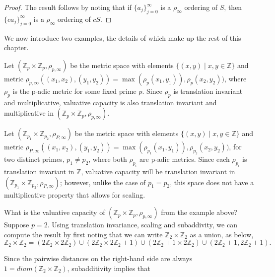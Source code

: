\begin{proof} 
The result follows by noting that if $\{a_j\}_{j=0}^\infty$ is a $\rho_\infty$ ordering of $S$, then $\{ca_j\}_{j=0}^\infty$ is a $\rho_\infty$ ordering of $cS$.
\end{proof}

We now introduce two examples, the details of which make up the rest of this chapter.\\ 

\begin{example}
	Let $(\mathbb{Z}_p \times \mathbb{Z}_p, \rho_{p,\infty})$ be the metric space with elements $\{(x,y)\mid x,y \in \mathbb{Z}\}$ and metric $\rho_{p,\infty}((x_1,x_2), (y_1,y_2)) = \max(\rho_p(x_1, y_1)), \rho_p(x_2, y_2))$, where $\rho_p$ is the p-adic metric for some fixed prime $p$. Since $\rho_p$ is translation invariant and multiplicative, valuative capacity is also translation invariant and multiplicative in  $(\mathbb{Z}_p \times \mathbb{Z}_p, \rho_{p,\infty})$.
\end{example}

\begin{example}
	Let $(\mathbb{Z}_{p_1} \times \mathbb{Z}_{p_2}, \rho_{P,\infty})$ be the metric space with elements $\{(x,y)\mid x,y \in \mathbb{Z}\}$ and metric $\rho_{P,\infty}((x_1,x_2), (y_1,y_2)) = \max(\rho_{p_1}(x_1, y_1)), \rho_{p_2}(x_2, y_2))$, for two distinct primes, $p_1 \neq p_2$, where both $\rho_{p_i}$ are p-adic metrics. Since each $\rho_{p_i}$ is translation invariant in $\mathbb{Z}$, valuative capacity will be translation invariant  in  $(\mathbb{Z}_{p_1} \times \mathbb{Z}_{p_2}, \rho_{P,\infty})$; however, unlike the case of $p_1=p_2$, this space does not have a multiplicative property that allows for scaling.
\end{example}

What is the valuative capacity of  $(\mathbb{Z}_p \times \mathbb{Z}_p, \rho_{p,\infty})$  from the example above? Suppose $p=2$.  Using translation invariance, scaling and subaddivity, we can compute the result by first noting that we can write $\mathbb{Z}_2 \times \mathbb{Z}_2$ as a union, as below,\\
\[
\mathbb{Z}_2 \times \mathbb{Z}_2 = (2\mathbb{Z}_2 \times 2\mathbb{Z}_2) \cup (2\mathbb{Z}_2 \times 2\mathbb{Z}_2 +1) \cup (2\mathbb{Z}_2+1 \times 2\mathbb{Z}_2) \cup (2\mathbb{Z}_2+1, 2\mathbb{Z}_2+1).
\]

Since the pairwise distances on the right-hand side are always $1 = diam(\mathbb{Z}_2 \times \mathbb{Z}_2)$, subadditivity implies that \\

